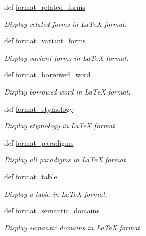 \begin{DoxyCompactItemize}
def \hyperlink{namespacelmf_1_1src_1_1config_1_1tex_ae3f96bb0f32f66e97fff513f1a6ca35b}{format\+\_\+related\+\_\+forms}
\begin{DoxyCompactList}\small\item\em Display related forms in La\+Te\+X format. \end{DoxyCompactList}\item 
def \hyperlink{namespacelmf_1_1src_1_1config_1_1tex_a3bd6d8a88328666fd8dbfd63609e8f67}{format\+\_\+variant\+\_\+forms}
\begin{DoxyCompactList}\small\item\em Display variant forms in La\+Te\+X format. \end{DoxyCompactList}\item 
def \hyperlink{namespacelmf_1_1src_1_1config_1_1tex_a1adca205fd3fa5465021ac35d564609c}{format\+\_\+borrowed\+\_\+word}
\begin{DoxyCompactList}\small\item\em Display borrowed word in La\+Te\+X format. \end{DoxyCompactList}\item 
def \hyperlink{namespacelmf_1_1src_1_1config_1_1tex_a5a066e3c951b0eef013a94098b778a90}{format\+\_\+etymology}
\begin{DoxyCompactList}\small\item\em Display etymology in La\+Te\+X format. \end{DoxyCompactList}\item 
def \hyperlink{namespacelmf_1_1src_1_1config_1_1tex_af42ed5326158d9b99710f2d57ff08b7c}{format\+\_\+paradigms}
\begin{DoxyCompactList}\small\item\em Display all paradigms in La\+Te\+X format. \end{DoxyCompactList}\item 
def \hyperlink{namespacelmf_1_1src_1_1config_1_1tex_a4052168ba8eae4761bb7b77a0c07bb80}{format\+\_\+table}
\begin{DoxyCompactList}\small\item\em Display a table in La\+Te\+X format. \end{DoxyCompactList}\item 
def \hyperlink{namespacelmf_1_1src_1_1config_1_1tex_ac1ab9ab056e3343fa370086560b32ae8}{format\+\_\+semantic\+\_\+domains}
\begin{DoxyCompactList}\small\item\em Display semantic domains in La\+Te\+X format. \end{DoxyCompactList}\item 

\end{DoxyCompactItemize}
